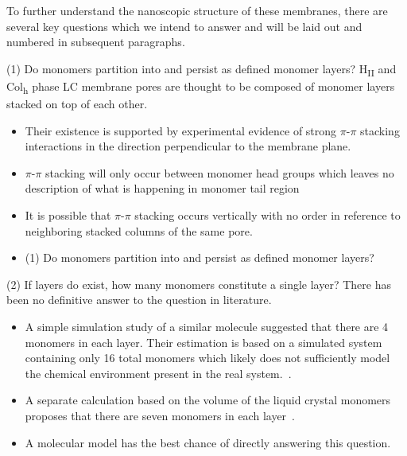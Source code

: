 \documentclass{article}
\begin{document}
  To further understand the nanoscopic structure of these membranes, there
  are several key questions which we intend to answer and will be laid out 
  and numbered in subsequent paragraphs. 

  (1) Do monomers partition into and persist as defined monomer layers?
  H\textsubscript{II} and Col\textsubscript{h} phase LC membrane pores are 
  thought to be composed of monomer layers stacked on top of each other. 
  \begin{itemize}
  	\item Their existence is supported by experimental evidence of strong 
	$\pi$-$\pi$ stacking interactions in the direction perpendicular to the
	membrane plane.
	\item $\pi$-$\pi$ stacking will only occur between monomer head groups which
	leaves no description of what is happening in monomer tail region
	\item It is possible that $\pi$-$\pi$ stacking occurs vertically 
	with no order in reference to neighboring stacked columns of the same pore.  %
	\item (1) Do monomers partition into and persist as defined monomer layers?
  \end{itemize}

  (2) If layers do exist, how many monomers constitute a single layer?
  There has been no definitive answer to the question in literature.
  \begin{itemize}
    \item A simple simulation study of a similar molecule 
suggested
    that there are 4 monomers in each layer. Their estimation is based on a
    simulated system containing only 16 total monomers which likely does not sufficiently
    model the chemical environment present in the real system.~\cite{zhu_methacrylated_2006}. 
    \item A separate calculation based on the volume of the liquid crystal monomers proposes
    that there are seven monomers in each layer~\cite{resel_structural_2000}. 
    \item A molecular model has the best chance of directly answering this question.
  \end{itemize}
    
\end{document}
